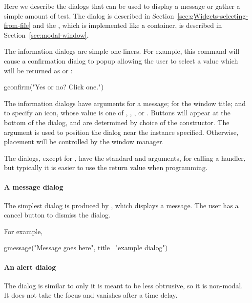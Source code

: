 Here we describe the dialogs that can be used to display a message or
gather a simple amount of test. The  dialog is
described in Section~\ref{sec:gWidgets-selecting-from-file} and the , which
is implemented like a container, is described in Section~\ref{sec:modal-window}.


The information dialogs are simple one-liners. For example, this
command will cause a confirmation dialog to popup allowing the user to
select a value which will be returned as  or :
\begin{Schunk}
\begin{Sinput}
 gconfirm("Yes or no? Click one.")
\end{Sinput}
\end{Schunk}


The information dialogs have arguments 
for a message;  for the window title; and
 to specify an icon, whose value is one of
, , , or
. Buttons will appear at the bottom of the dialog, and
are determined by choice of the constructor. The
 argument is used to position the dialog
near the  instance specified. Otherwise, placement will
be controlled by the window manager.

The dialogs, except for , have the standard
 and  arguments, for calling a handler, but
typically it is easier to use the return value when programming.

\paragraph{A message dialog}
The simplest dialog is produced by , which
displays a message. The user has a cancel button to dismiss the dialog.


For example,
\begin{Schunk}
\begin{Sinput}
 gmessage("Message goes here", title="example dialog")
\end{Sinput}
\end{Schunk}


\paragraph{An alert dialog}
The  dialog is similar to  only it is
meant to be less obtrusive, so it is non-modal. It does not take the
focus and vanishes after a time delay.

